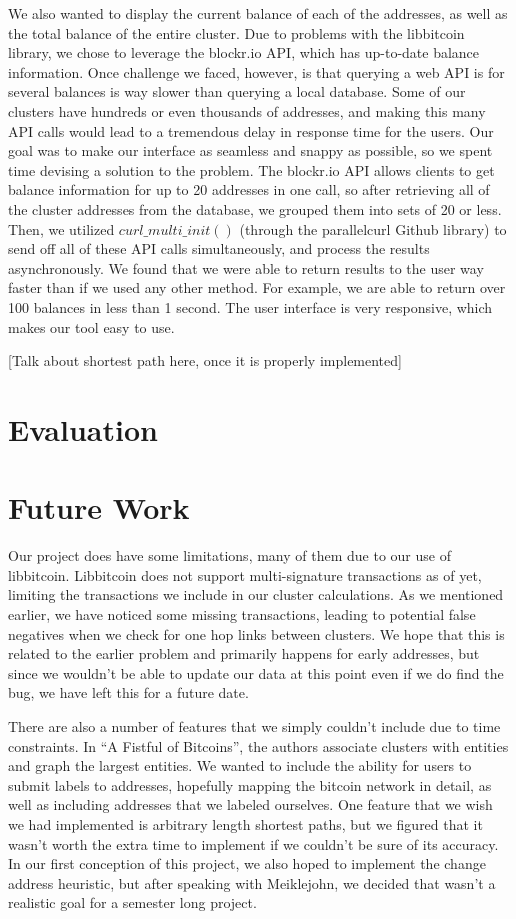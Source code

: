 \documentclass[10pt, letterpaper, twocolumn, twoside]{article}
\begin{document}
We also wanted to display the current balance of each of the addresses, as well as the total balance of the entire cluster. Due to problems with the libbitcoin library, we chose to leverage the blockr.io API, which has up-to-date balance information. Once challenge we faced, however, is that querying a web API is for several balances is way slower than querying a local database. Some of our clusters have hundreds or even thousands of addresses, and making this many API calls would lead to a tremendous delay in response time for the users. Our goal was to make our interface as seamless and snappy as possible, so we spent time devising a solution to the problem. The blockr.io API allows clients to get balance information for up to 20 addresses in one call, so after retrieving all of the cluster addresses from the database, we grouped them into sets of 20 or less. Then, we utilized $curl\_multi\_init()$ (through the parallelcurl Github library) to send off all of these API calls simultaneously, and process the results asynchronously. We found that we were able to return results to the user way faster than if we used any other method. For example, we are able to return over 100 balances in less than 1 second. The user interface is very responsive, which makes our tool easy to use.

[Talk about shortest path here, once it is properly implemented]

\section{Evaluation}

\section{Future Work}
Our project does have some limitations, many of them due to our use of libbitcoin. Libbitcoin does not support multi-signature transactions as of yet, limiting the transactions we include in our cluster calculations. As we mentioned earlier, we have noticed some missing transactions, leading to potential false negatives when we check for one hop links between clusters. We hope that this is related to the earlier problem and primarily happens for early addresses, but since we wouldn't be able to update our data at this point even if we do find the bug, we have left this for a future date. 

There are also a number of features that we simply couldn't include due to time constraints. In ``A Fistful of Bitcoins'', the authors associate clusters with entities and graph the largest entities. We wanted to include the ability for users to submit labels to addresses, hopefully mapping the bitcoin network in detail, as well as including addresses that we labeled ourselves. One feature that we wish we had implemented is arbitrary length shortest paths, but we figured that it wasn't worth the extra time to implement if we couldn't be sure of its accuracy. In our first conception of this project, we also hoped to implement the change address heuristic, but after speaking with Meiklejohn, we decided that wasn't a realistic goal for a semester long project.
\end{document}
